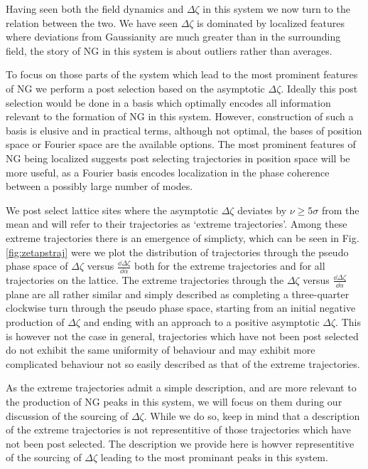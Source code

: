 Having seen both the field dynamics and $\Delta\zeta$ in this system we now turn to the relation between the two.
We have seen $\Delta\zeta$ is dominated by localized features where deviations from Gaussianity are much greater than in the surrounding field, the story of NG in this system is about outliers rather than averages.

To focus on those parts of the system which lead to the most prominent features of NG we perform a post selection based on the asymptotic $\Delta\zeta$.
Ideally this post selection would be done in a basis which optimally encodes all information relevant to the formation of NG in this system.
However, construction of such a basis is elusive and in practical terms, although not optimal, the bases of position space or Fourier space are the available options. 
The most prominent features of NG being localized suggests post selecting trajectories in position space will be more useful, as a Fourier basis encodes localization in the phase coherence between a possibly large number of modes.

We post select lattice sites where the asymptotic $\Delta\zeta$ deviates by $\nu \ge 5 \sigma$ from the mean and will refer to their trajectories as `extreme trajectories'. Among these extreme trajectories there is an emergence of simplicty, which can be seen in Fig. \ref{fig:zetapstraj} were we plot the distribution of trajectories through the pseudo phase space of $\Delta\zeta$ versus $\frac{\dd\Delta\zeta}{\dd\alpha}$ both for the extreme trajectories and for all trajectories on the lattice. The extreme trajectories through the $\Delta\zeta$ versus $\frac{\dd\Delta\zeta}{\dd\alpha}$ plane are all rather similar and simply described as completing a three-quarter clockwise turn through the pseudo phase space, starting from an initial negative production of $\Delta\zeta$ and ending with an approach to a positive asymptotic $\Delta\zeta$. This is however not the case in general, trajectories which have not been post selected do not exhibit the same uniformity of behaviour and may exhibit more complicated behaviour not so easily described as that of the extreme trajectories. 

\Fzetapstraj

As the extreme trajectories admit a simple description, and are more relevant to the production of NG peaks in this system, we will focus on them during our discussion of the sourcing of $\Delta\zeta$. While we do so, keep in mind that a description of the extreme trajectories is not representitive of those trajectories which have not been post selected. The description we provide here is howver representitive of the sourcing of $\Delta\zeta$ leading to the most prominant peaks in this system.

